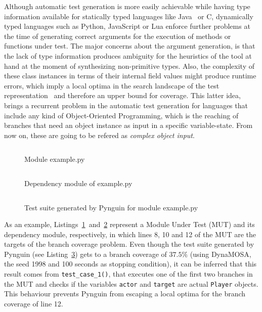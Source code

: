 \documentclass[%
  chapterprefix=false,%
  open=right,%
  twoside=true,%
  paper=a4,%
  logofile={Figures/logo.png},%
  thesistype=master,%
  UKenglish,%
]{se2thesis}
\begin{document}
Although automatic test generation is more easily achievable while having type information available for statically typed languages like Java~\cite{DBLP:journals/tse/FraserA13} or C, dynamically typed languages such as Python, JavaScript or Lua enforce further problems at the time of generating correct arguments for the execution of methods or functions under test.
The major concerns about the argument generation, is that the lack of type information produces ambiguity for the heuristics of the tool at hand at the moment of synthesizing non-primitive types.
Also, the complexity of these class instances in terms of their internal field values might produce runtime errors, which imply a local optima in the search landscape of the test representation~\cite{DBLP:conf/sigsoft/0001O00D21} and therefore an upper bound for coverage.
This latter idea, brings a recurrent problem in the automatic test generation for languages that include any kind of Object-Oriented Programming, which is the reaching of branches that need an object instance as input in a specific variable-state.
From now on, these are going to be refered as \textit{complex object input}.

\begin{figure}
  \inputminted[linenos]{python}{Figures/example.py}
  \caption{Module example.py\label{lst:1}}
\end{figure}

\begin{figure}
\inputminted[linenos]{python}{Figures/dependencies.py}
\caption{Dependency module of example.py\label{lst:2}}
\end{figure}

\begin{figure}
  \inputminted[linenos]{python}{Figures/test1.py}
  \caption{Test suite generated by Pynguin for module example.py\label{lst:3}}
\end{figure}

As an example, Listings~\ref{lst:1}~and~\ref{lst:2} represent a Module Under Test (MUT) and its dependency module, respectively, in which lines 8, 10 and 12 of the MUT are the targets of the branch coverage problem.
Even though the test suite generated by Pynguin (see Listing~\ref{lst:3}) gets to a branch coverage of \(37.5\%\) (using DynaMOSA, the seed 1998 and 100 seconds as stopping condition), it can be inferred that this result comes from \verb|test_case_1()|, that executes one of the first two branches in the MUT and checks if the variables \verb|actor| and \verb|target| are actual \verb|Player| objects.
This behaviour prevents Pynguin from escaping a local optima for the branch coverage of line 12.
\end{document}

